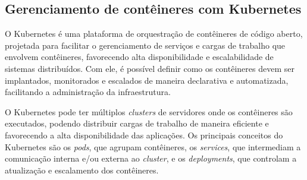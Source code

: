 




\subsection{Gerenciamento de contêineres com Kubernetes}\label{secao-kubernetes}
O Kubernetes é uma plataforma de orquestração de contêineres de código aberto, projetada para facilitar o gerenciamento de serviços e cargas de trabalho que envolvem contêineres, favorecendo alta disponibilidade e escalabilidade de sistemas distribuídos. Com ele, é possível definir como os contêineres devem ser implantados, monitorados e escalados de maneira declarativa e automatizada, facilitando a administração da infraestrutura. \cite{kubernetes}

O Kubernetes pode ter múltiplos \emph{clusters} de servidores onde os contêineres são executados, podendo distribuir cargas de trabalho de maneira eficiente e favorecendo a alta disponibilidade das aplicações. Os principais conceitos do Kubernetes são os \emph{pods}, que agrupam contêineres, os \emph{services}, que intermediam a comunicação interna e/ou externa ao \emph{cluster}, e os \emph{deployments}, que controlam a atualização e escalamento dos contêineres. \cite{kubernetes}


